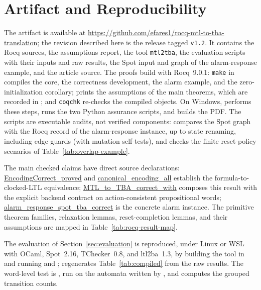 \documentclass{ieeeaccess}
\newcommand{\Rocqid}[1]{\url{#1}}
\begin{document}


\section{Artifact and Reproducibility}
\label{sec:artifact}
The artifact is available at
\url{https://github.com/efares1/rocq-mtl-to-tba-translation};
the revision described here is the release tagged \texttt{v1.2}.
It contains the Rocq sources, the assumptions report, the tool
\texttt{mtl2tba}, the evaluation scripts with their inputs and raw results,
the Spot input and graph of the alarm-response example, and the article
source. The proofs build with Rocq~9.0.1: \texttt{make} in 
compiles the core, the correctness development, the alarm example, and the
zero-initialization corollary;
 prints the assumptions of the main theorems,
which are recorded in ; and \texttt{coqchk}
re-checks the compiled objects. On Windows, 
performs these steps, runs the two Python assurance scripts, and builds the
PDF. The scripts are executable audits, not verified components:
 compares the
Spot graph with the Rocq record of the alarm-response instance, up to state
renaming, including edge guards (with mutation self-tests), and
 checks the finite
reset-policy scenarios of Table~\ref{tab:overlap-example}.

The main checked claims have direct source declarations:
\Rocqid{EncodingCorrect_proved} and
\Rocqid{canonical_encoding_all} establish the formula-to-clocked-LTL
equivalence; \Rocqid{MTL_to_TBA_correct_with} composes this result with
the explicit backend contract on action-consistent propositional words;
\Rocqid{alarm_response_spot_tba_correct} is the concrete alarm
instance. The primitive theorem families, relaxation lemmas, reset-completion
lemmas, and their assumptions are mapped in
Table~\ref{tab:rocq-result-map}.

The evaluation of Section~\ref{sec:evaluation} is reproduced, under Linux or
WSL with OCaml, Spot~2.16, TChecker~0.8, and ltl2ba~1.3, by building the tool
in  and running  and
; 
regenerates Table~\ref{tab:compiled} from the raw results. The word-level
test is , run on the automata written by
, and 
computes the grouped transition counts.
\end{document}
